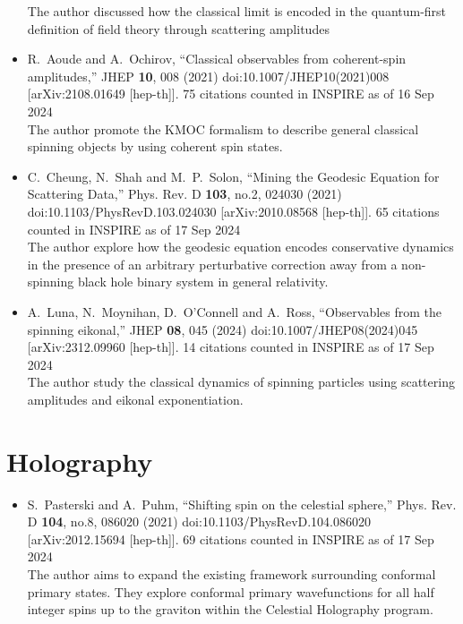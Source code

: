 \documentclass[a4paper,12pt]{article}
\begin{document}
\begin{itemize}
    The author discussed how the classical limit is encoded in the quantum-first definition of field theory through scattering amplitudes
    \item %
    R.~Aoude and A.~Ochirov,
    ``Classical observables from coherent-spin amplitudes,''
    JHEP \textbf{10}, 008 (2021)
    doi:10.1007/JHEP10(2021)008
    [arXiv:2108.01649 [hep-th]].
    75 citations counted in INSPIRE as of 16 Sep 2024\\
    The author promote the KMOC formalism  to describe general classical spinning objects by using coherent spin states. 
    \item %
    C.~Cheung, N.~Shah and M.~P.~Solon,
    ``Mining the Geodesic Equation for Scattering Data,''
    Phys. Rev. D \textbf{103}, no.2, 024030 (2021)
    doi:10.1103/PhysRevD.103.024030
    [arXiv:2010.08568 [hep-th]].
    65 citations counted in INSPIRE as of 17 Sep 2024\\
    The author explore how the geodesic equation encodes conservative dynamics in the presence of an arbitrary
    perturbative correction away from a non-spinning black hole binary system in general relativity.
    \item %
    A.~Luna, N.~Moynihan, D.~O'Connell and A.~Ross,
    ``Observables from the spinning eikonal,''
    JHEP \textbf{08}, 045 (2024)
    doi:10.1007/JHEP08(2024)045
    [arXiv:2312.09960 [hep-th]].
    14 citations counted in INSPIRE as of 17 Sep 2024\\
    The author study the classical dynamics of spinning particles using scattering amplitudes
 and eikonal exponentiation.
\end{itemize}
\section*{Holography}
\begin{itemize}
    \item %
    S.~Pasterski and A.~Puhm,
    ``Shifting spin on the celestial sphere,''
    Phys. Rev. D \textbf{104}, no.8, 086020 (2021)
    doi:10.1103/PhysRevD.104.086020
    [arXiv:2012.15694 [hep-th]].
    69 citations counted in INSPIRE as of 17 Sep 2024\\
    The author aims to  expand the existing framework surrounding conformal primary
    states. They explore conformal primary wavefunctions for all half integer spins up to the graviton within the Celestial Holography program.
    
\end{itemize}
\end{document}
